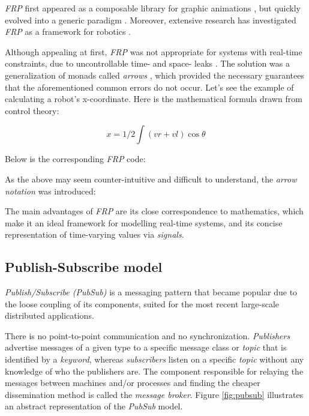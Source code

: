 \documentclass[sigplan,review,anonymous]{acmart}
\begin{document}
\textit{FRP} first appeared as a composable library for graphic animations
\cite{fran}, but quickly evolved into a generic paradigm
\cite{survey_frp,real_frp,pushpull_frp}. Moreover, extensive research has
investigated \textit{FRP} as a framework for robotics
\cite{arrows_robots,lambda_in_motion}.

Although appealing at first, \textit{FRP} was not appropriate for systems  with
real-time constraints, due to uncontrollable time- and space- leaks
\cite{event_frp}. The solution was a generalization of monads called
\textit{arrows} \cite{arrows}, which provided the necessary guarantees that the
aforementioned common errors do not occur. Let's see the example of calculating
a robot's x-coordinate. Here is the mathematical formula drawn from control
theory:

$$ x = 1/2 \int (vr + vl) \cos\theta $$

Below is the corresponding \textit{FRP} code:


As the above may seem counter-intuitive and difficult to understand, the
\textit{arrow notation}\cite{arrows_notation} was introduced:


The main advantages of \textit{FRP} are its close correspondence to
mathematics\cite{survey_frp}, which make it an ideal framework for modelling
real-time systems, and its concise representation of time-varying values via
\textit{signals}.

\subsection{Publish-Subscribe model}

\textit{Publish/Subscribe (PubSub)} is a messaging pattern that became popular
due to the loose coupling of its components, suited for the most recent
large-scale distributed applications.

There is no point-to-point communication and no synchronization.
\textit{Publishers} advertise messages of a given type to a specific message
class or \textit{topic} that is identified by a \textit{keyword}, whereas
\textit{subscribers} listen on a specific \textit{topic} without any knowledge
of who the publishers are. The component responsible for relaying the messages
between machines and/or processes and finding the cheaper dissemination method
is called the \textit{message broker}. Figure \ref{fig:pubsub} illustrates an
abstract representation of the \textit{PubSub} model.
\end{document}
